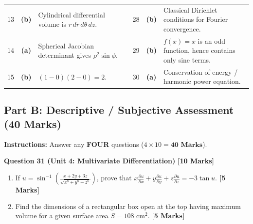 \begin{table}[htbp]
\begin{tabularx}{\textwidth}{l c X l c X}
13 & \textbf{(b)} & Cylindrical differential volume is $r\,dr\,d\theta\,dz$. & 28 & \textbf{(b)} & Classical Dirichlet conditions for Fourier convergence. \\
14 & \textbf{(a)} & Spherical Jacobian determinant gives $\rho^2\sin\phi$. & 29 & \textbf{(b)} & $f(x)=x$ is an odd function, hence contains only sine terms. \\
15 & \textbf{(b)} & $(1 - 0)(2 - 0) = 2$. & 30 & \textbf{(a)} & Conservation of energy / harmonic power equation. \\
\bottomrule
\end{tabularx}
\end{table}

\newpage
\subsection*{Part B: Descriptive / Subjective Assessment (40 Marks)}
\noindent
\textbf{Instructions:} Answer any \textbf{FOUR} questions ($4 \times 10 = \mathbf{40\text{ Marks}}$).

\vspace{3mm}
\noindent\textbf{Question 31 (Unit 4: Multivariate Differentiation)} \hfill \textbf{[10 Marks]}
\begin{enumerate}[label=(\alph*),topsep=2pt,itemsep=2pt]
    \item If $u = \sin^{-1}\left(\frac{x+2y+3z}{\sqrt{x^8+y^8+z^8}}\right)$, prove that $x\frac{\partial u}{\partial x} + y\frac{\partial u}{\partial y} + z\frac{\partial u}{\partial z} = -3\tan u$. \hfill \textbf{[5 Marks]}
    \item Find the dimensions of a rectangular box open at the top having maximum volume for a given surface area $S = 108\text{ cm}^2$. \hfill \textbf{[5 Marks]}
\end{enumerate}

